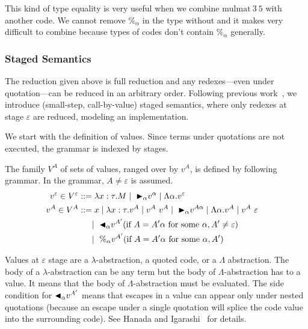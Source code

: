 This kind of type equality is very useful when we combine $\text{mulmat}\ 3\ 5$ with another code.
We cannot remove $\%_\alpha$ in the type without \QPercent and it makes very difficult to combine
because types of codes don't contain $\%_\alpha$ generally.


\subsubsection{Staged Semantics}

The reduction given above is full reduction and any redexes---even
under quotation---can be reduced in an arbitrary order.  Following
previous work~\cite{}, we introduce (small-step, call-by-value) staged
semantics, where only redexes at stage $\varepsilon$ are reduced, modeling an
implementation.

We start with the definition of values.  Since terms under quotations are
not executed, the grammar is indexed by stages.

\begin{definition}[Values]
	The family $V^A$ of sets of values, ranged over by $v^A$,
	is defined by following grammar.  In the grammar, $A \neq \varepsilon$ is assumed.
	\begin{align*}
		v^\varepsilon \in V^\varepsilon & ::= \lambda x:\tau.M \mid\ {\mathop{\blacktriangleright}}_\alpha v^\alpha \mid \Lambda\alpha.v^\varepsilon                                       & \\
		v^A \in V^A               & ::= x \mid \lambda x:\tau.v^A \mid v^A\ v^A \mid\ {\mathop{\blacktriangleright}}_\alpha v^{A\alpha} \mid \Lambda\alpha.v^A \mid v^A\ \varepsilon & \\
		                         & \quad\   \mid\ {\mathop{\blacktriangleleft}}_\alpha v^{A'} (\text{if } A = A'\alpha \text{ for some } \alpha, A' \neq \varepsilon)                          & \\
                                          & \quad\   \mid\ \%_\alpha v^{A'} (\text{if } A = A'\alpha  \text{ for some } \alpha, A')
	\end{align*}
\end{definition}

Values at $\varepsilon$ stage are a $\lambda$-abstraction, a quoted code,
or a $\Lambda$ abstraction.  The body of a $\lambda$-abstraction can
be any term but the body of $\Lambda$-abstraction has to a value.  It
means that the body of $\Lambda$-abstraction must be evaluated.  The
side condition for ${\mathop{\blacktriangleleft}}_\alpha v^{A'}$ means that escapes in a value
can appear only under nested quotations (because an escape under a
single quotation will splice the code value into the surrounding
code).  See Hanada and Igarashi~\cite{} for details.


